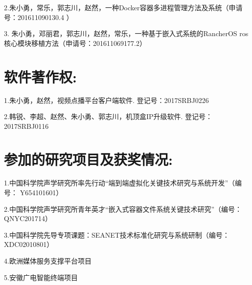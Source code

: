 2.朱小勇，常乐，郭志川，赵然，一种Docker容器多进程管理方法及系统（申请号：201611090130.4 ）

3. 朱小勇，邓丽君，郭志川，赵然，常乐，一种基于嵌入式系统的RancherOS ros核心模块移植方法（申请号：201611069177.2）

\section*{软件著作权:}

1.朱小勇，赵然，视频点播平台客户端软件. 登记号：2017SRBJ0226

2.韩锐、李超、赵然、朱小勇、郭志川，机顶盒IP升级软件. 登记号：2017SRBJ0116

\section*{参加的研究项目及获奖情况:}

1.中国科学院声学研究所率先行动“端到端虚拟化关键技术研究与系统开发”（编号： Y654101601）

2.中国科学院声学研究所青年英才“嵌入式容器文件系统关键技术研究”（编号：QNYC201714）

3.中国科学院先导专项课题：SEANET技术标准化研究与系统研制（编号：XDC02010801） 

4.欧洲媒体服务支撑平台项目

5.安徽广电智能终端项目


\cleardoublepage[plain]%

